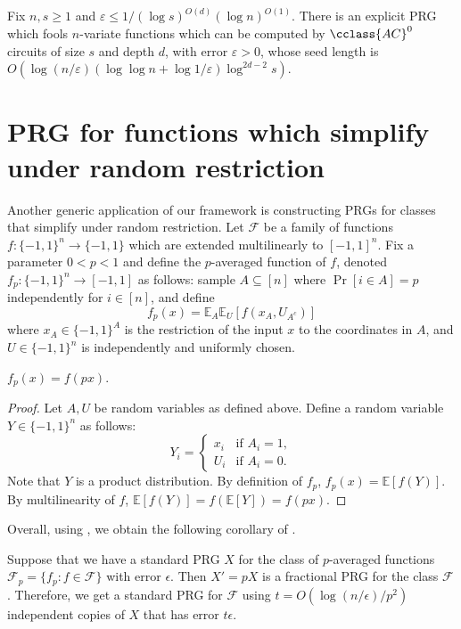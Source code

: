\documentclass{toc}
\newcommand{\E}{\mathbb{E}}
\newcommand{\FF}{\mathcal{F}}
\newcommand{\eps}{\varepsilon}
\begin{document}
\begin{corollary}
\label{cor:AC0}
	Fix $n,s \ge 1$ and $\eps\leq 1/(\log s)^{O(d)}(\log n)^{O(1)}$. There is an explicit PRG which fools $n$-variate functions which can be computed
by $\cclass{AC}^0$ circuits of size $s$ and depth $d$, with error $\eps>0$,
whose seed length is $O(\log (n/\eps) (\log \log n + \log 1/\eps) \log^{2d-2} s)$.
\end{corollary}

\section{PRG for functions which simplify under random restriction}
\label{sec:random_restriction}
Another generic application of our framework is constructing PRGs for classes that simplify under random restriction.
Let $\FF$ be a family of functions  $f:\{-1,1\}^n \to \{-1,1\}$  which are extended multilinearly to $[-1,1]^n$. Fix a parameter $0<p<1$ and define the $p$-averaged function of $f$, denoted $f_p:\{-1,1\}^n \to [-1,1]$ as follows:
sample $A \subseteq [n]$ where $\Pr[i \in A]=p$ independently for $i \in [n]$, and define
$$f_p(x) = \E_A\E_U [f(x_A,U_{A^c})]$$
where $x_A \in \{-1,1\}^A$ is the restriction of the input $x$ to the coordinates in $A$, and $U \in \{-1,1\}^n$ is independently and uniformly chosen.
 \begin{claim}
  \label{claim:p_averaged}
 $f_p (x) = f(px)$.
 \end{claim}
 \begin{proof}
 Let $A,U$ be random variables as defined above. Define a random variable
 $Y \in \{-1,1\}^n$ as follows:
$$
Y_i =
\begin{cases}
x_i & \text{if } A_i=1,\\
U_i & \text{if } A_i=0.
\end{cases}
$$
Note that $Y$ is a product distribution.
By definition of $f_p$, $f_p(x) = \E[f(Y)]$. By multilinearity of $f$,
$\E[f(Y)]=f(\E[Y]) = f(px)$.
\end{proof}
Overall, using , we obtain the following corollary of .
\begin{corollary}
%
%
	
Suppose that we have a standard PRG $X$ for the class of $p$-averaged functions $\FF_p = \{f_p : f\in \FF\}$ with error $\epsilon$. Then $X'=pX$ is a fractional PRG for the class $\FF$. Therefore, we get a standard PRG for $\FF$ using $t = O(\log(n/\epsilon)/p^2)$ independent copies of $X$ that has error $t\epsilon$.
\end{corollary}
\end{document}

